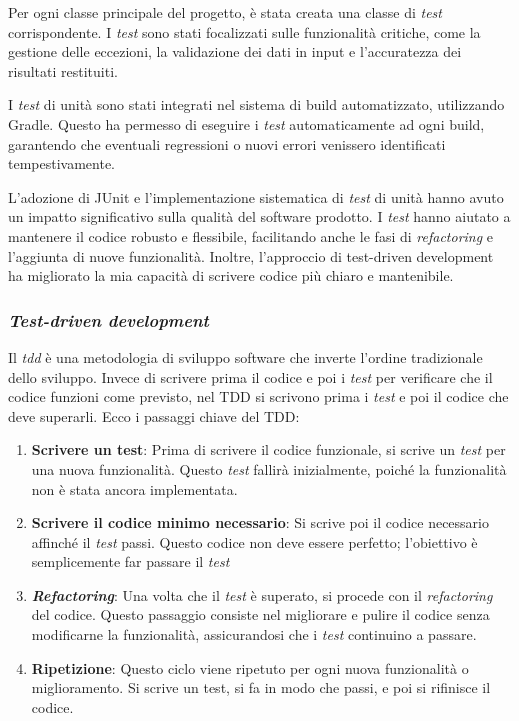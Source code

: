 Per ogni classe principale del progetto, è stata creata una classe di \textit{test} corrispondente. 
I \textit{test} sono stati focalizzati sulle funzionalità critiche, come la gestione delle eccezioni, 
la validazione dei dati in input e l'accuratezza dei risultati restituiti.

I \textit{test} di unità sono stati integrati nel sistema di build automatizzato, utilizzando Gradle. 
Questo ha permesso di eseguire i \textit{test} automaticamente ad ogni build, 
garantendo che eventuali regressioni o nuovi errori venissero identificati tempestivamente.

L'adozione di JUnit e l'implementazione sistematica di \textit{test} di unità hanno avuto un impatto significativo sulla qualità del software prodotto. 
I \textit{test} hanno aiutato a mantenere il codice robusto e flessibile, facilitando anche le fasi di \textit{refactoring} e l'aggiunta di nuove funzionalità. 
Inoltre, l'approccio di test-driven development ha migliorato la mia capacità di scrivere codice più chiaro e mantenibile.

\subsubsection{\textit{Test-driven development}}
Il \textit{\gls{tdd}} è una metodologia di sviluppo software che inverte l'ordine tradizionale dello sviluppo. 
Invece di scrivere prima il codice e poi i \textit{test} per verificare che il codice funzioni come previsto, nel TDD si scrivono prima 
i \textit{test} e poi il codice che deve superarli. Ecco i passaggi chiave del TDD:
\begin{enumerate}
  \item \textbf{Scrivere un test}: Prima di scrivere il codice funzionale, si scrive un \textit{test} per una nuova funzionalità. Questo \textit{test} fallirà inizialmente, poiché la funzionalità non è stata ancora implementata.
  \item \textbf{Scrivere il codice minimo necessario}: Si scrive poi il codice necessario affinché il \textit{test} passi. Questo codice non deve essere perfetto; l'obiettivo è semplicemente far passare il \textit{test} 
  \item \textit{\textbf{Refactoring}}: Una volta che il \textit{test} è superato, si procede con il \textit{refactoring} del codice. Questo passaggio consiste nel migliorare e pulire il codice senza modificarne la funzionalità, assicurandosi che i \textit{test} continuino a passare.
  \item \textbf{Ripetizione}: Questo ciclo viene ripetuto per ogni nuova funzionalità o miglioramento. Si scrive un test, si fa in modo che passi, e poi si rifinisce il codice.
\end{enumerate}

